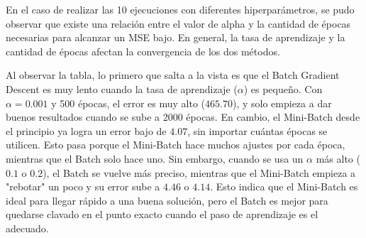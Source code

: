\documentclass[conference]{IEEEtran}
\begin{document}
En el caso de realizar las 10 ejecuciones con diferentes hiperparámetros, se pudo observar que existe una relación entre el valor de alpha y la cantidad de épocas necesarias para alcanzar un MSE bajo. En general, la tasa de aprendizaje y la cantidad de épocas afectan la convergencia de los dos métodos.
\begin{table}[H]
\caption{Resultados de las 10 ejecuciones con diferentes hiperparámetros}
\label{tab:comparativa_gd}
\centering
{}
\end{table}

Al observar la tabla, lo primero que salta a la vista es que el Batch Gradient Descent es muy lento cuando la tasa de aprendizaje ($\alpha$) es pequeño. Con $\alpha = 0.001$ y 500 épocas, el error es muy alto ($465.70$), y solo empieza a dar buenos resultados cuando se sube a 2000 épocas. En cambio, el Mini-Batch desde el principio ya logra un error bajo de $4.07$, sin importar cuántas épocas se utilicen. Esto pasa porque el Mini-Batch hace muchos ajustes por cada época, mientras que el Batch solo hace uno. Sin embargo, cuando se usa un $\alpha$ más alto ($0.1$ o $0.2$), el Batch se vuelve más preciso, mientras que el Mini-Batch empieza a "rebotar" un poco y su error sube a $4.46$ o $4.14$. Esto indica que el Mini-Batch es ideal para llegar rápido a una buena solución, pero el Batch es mejor para quedarse clavado en el punto exacto cuando el paso de aprendizaje es el adecuado.
\end{document}
